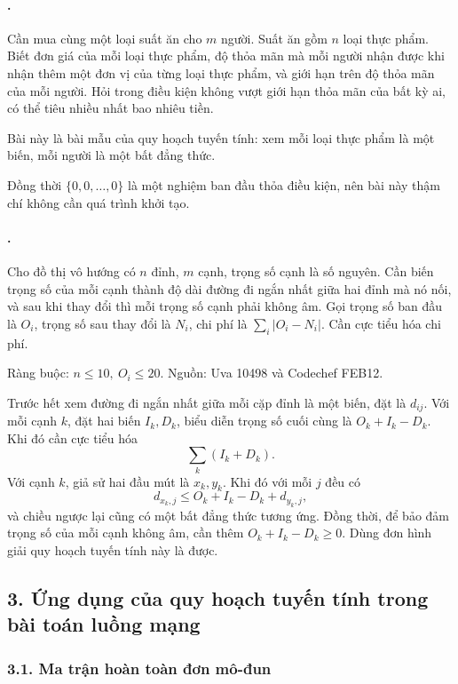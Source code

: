 \documentclass[11pt]{article}
\begin{document}
\paragraph{.}
Cần mua cùng một loại suất ăn cho \(m\) người. Suất ăn gồm \(n\) loại thực
phẩm. Biết đơn giá của mỗi loại thực phẩm, độ thỏa mãn mà mỗi người nhận được
khi nhận thêm một đơn vị của từng loại thực phẩm, và giới hạn trên độ thỏa mãn
của mỗi người. Hỏi trong điều kiện không vượt giới hạn thỏa mãn của bất kỳ ai,
có thể tiêu nhiều nhất bao nhiêu tiền.

Bài này là bài mẫu của quy hoạch tuyến tính: xem mỗi loại thực phẩm là một
biến, mỗi người là một bất đẳng thức.

Đồng thời \(\{0,0,\ldots,0\}\) là một nghiệm ban đầu thỏa điều kiện, nên bài
này thậm chí không cần quá trình khởi tạo.

\paragraph{.}
Cho đồ thị vô hướng có \(n\) đỉnh, \(m\) cạnh, trọng số cạnh là số nguyên.
Cần biến trọng số của mỗi cạnh thành độ dài đường đi ngắn nhất giữa hai đỉnh
mà nó nối, và sau khi thay đổi thì mỗi trọng số cạnh phải không âm. Gọi trọng
số ban đầu là \(O_i\), trọng số sau thay đổi là \(N_i\), chi phí là
\(\sum_i |O_i-N_i|\). Cần cực tiểu hóa chi phí.

Ràng buộc: \(n\le 10,\ O_i\le 20\). Nguồn: Uva 10498 và Codechef FEB12.

Trước hết xem đường đi ngắn nhất giữa mỗi cặp đỉnh là một biến, đặt là
\(d_{ij}\). Với mỗi cạnh \(k\), đặt hai biến \(I_k,D_k\), biểu diễn trọng số
cuối cùng là \(O_k+I_k-D_k\). Khi đó cần cực tiểu hóa
\[
  \sum_k(I_k+D_k).
\]
Với cạnh \(k\), giả sử hai đầu mút là \(x_k,y_k\). Khi đó với mỗi \(j\) đều có
\[
  d_{x_k,j}\le O_k+I_k-D_k+d_{y_k,j},
\]
và chiều ngược lại cũng có một bất đẳng thức tương ứng. Đồng thời, để bảo đảm
trọng số của mỗi cạnh không âm, cần thêm \(O_k+I_k-D_k\ge 0\). Dùng đơn hình
giải quy hoạch tuyến tính này là được.

\subsection*{3. Ứng dụng của quy hoạch tuyến tính trong bài toán luồng mạng}

\subsubsection*{3.1. Ma trận hoàn toàn đơn mô-đun}
\end{document}
